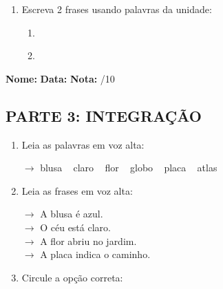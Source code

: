 \begin{exercicio}
\begin{enumerate}[resume]
  \item Escreva 2 frases usando palavras da unidade:
  \begin{enumerate}[label=\alph*)]
    \item \underline{\hspace{8cm}}
    \item \underline{\hspace{8cm}}
  \end{enumerate}

\end{enumerate}

\end{exercicio}



\begin{exercicio}

\noindent\textbf{Nome:} \underline{\hspace{3.2cm}} \quad \textbf{Data:} \underline{\hspace{1.6cm}} \quad \textbf{Nota:} \underline{\hspace{0.9cm}}/10


\subsection*{PARTE 3: INTEGRAÇÃO}

\begin{enumerate}[resume]

  \item Leia as palavras em voz alta:
  \begin{center}
  $\rightarrow$ blusa ~ claro ~ flor ~ globo ~ placa ~ atlas
  \end{center}

  \item Leia as frases em voz alta:
  \begin{center}
  $\rightarrow$ A blusa é azul.\\
  $\rightarrow$ O céu está claro.\\
  $\rightarrow$ A flor abriu no jardim.\\
  $\rightarrow$ A placa indica o caminho.\\
  \end{center}

  \item Circule a opção correta:
  \begin{enumerate}[label=(\alph*)]


\end{enumerate}
\end{enumerate}
\end{exercicio}
